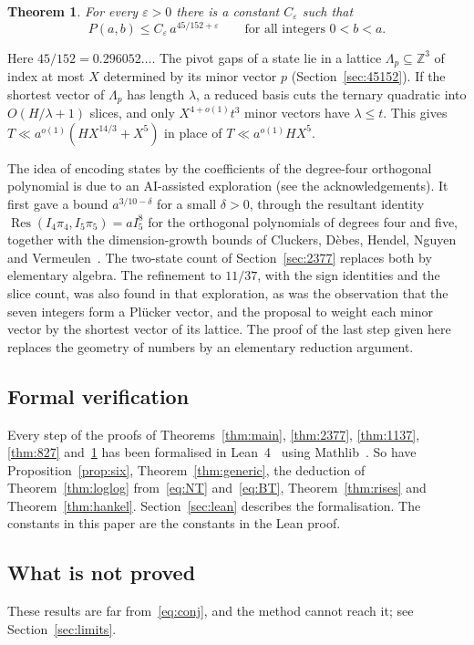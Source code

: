 \documentclass[11pt]{amsart}
\newtheorem{theorem}{Theorem}[section]
\theoremstyle{definition}
\theoremstyle{remark}
\begin{document}
\begin{theorem}\label{thm:45152}
For every $\varepsilon>0$ there is a constant $C_\varepsilon$ such that
\[
P(a,b)\le C_\varepsilon\, a^{45/152+\varepsilon}\qquad\text{for all integers }0<b<a .
\]
\end{theorem}

Here $45/152=0.296052\ldots$. The pivot gaps of a state lie in a lattice $\Lambda_p\subseteq\mathbb
Z^3$ of index at most $X$ determined by its minor vector $p$ (Section~\ref{sec:45152}). If the
shortest vector of $\Lambda_p$ has length $\lambda$, a reduced basis cuts the ternary quadratic
into $O(H/\lambda+1)$ slices, and only $X^{4+o(1)}t^3$ minor vectors have $\lambda\le t$. This
gives $T\ll a^{o(1)}(HX^{14/3}+X^5)$ in place of $T\ll a^{o(1)}HX^5$.

The idea of encoding states by the coefficients of the degree-four orthogonal polynomial is due
to an AI-assisted exploration (see the acknowledgements). It first gave a bound
$a^{3/10-\delta}$ for a small $\delta>0$, through the resultant identity
$\operatorname{Res}(I_4\pi_4,I_5\pi_5)=aI_5^8$ for the orthogonal polynomials of degrees four and
five, together with the dimension-growth bounds of Cluckers, D\`ebes, Hendel, Nguyen and
Vermeulen~\cite{CDHNV}. The two-state count of Section~\ref{sec:2377} replaces both by
elementary algebra. The refinement to $11/37$, with the sign identities and the slice count, was
also found in that exploration, as was the observation that the seven integers form a
Pl\"ucker vector, and the proposal to weight each minor vector by the shortest vector of its
lattice. The proof of the last step given here replaces the geometry of numbers by an elementary
reduction argument.

\subsection*{Formal verification}
Every step of the proofs of Theorems~\ref{thm:main}, \ref{thm:2377}, \ref{thm:1137},
\ref{thm:827} and~\ref{thm:45152} has been formalised in Lean~4~\cite{Lean}
using Mathlib~\cite{Mathlib}. So have Proposition~\ref{prop:six}, Theorem~\ref{thm:generic},
the deduction of Theorem~\ref{thm:loglog} from~\eqref{eq:NT} and~\eqref{eq:BT},
Theorem~\ref{thm:rises} and Theorem~\ref{thm:hankel}.
Section~\ref{sec:lean} describes the formalisation. The constants in this paper are the
constants in the Lean proof.

\subsection*{What is not proved}
These results are far from~\eqref{eq:conj}, and the method cannot reach it; see
Section~\ref{sec:limits}.
\end{document}
